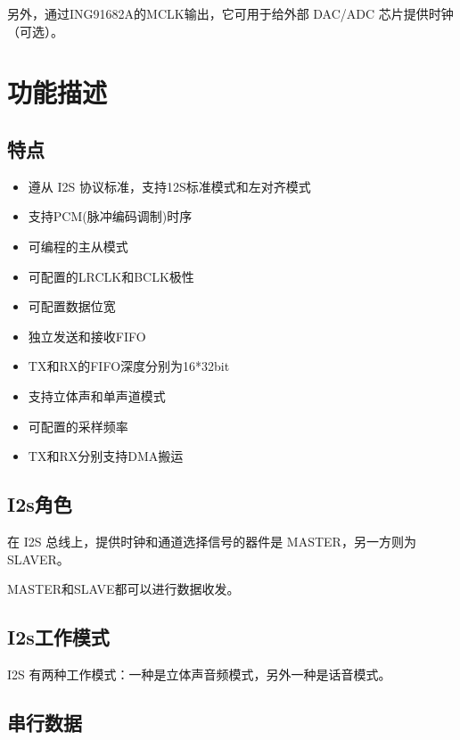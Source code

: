 \documentclass[
  12pt,
]{book}
\begin{document}
另外，通过ING91682A的MCLK输出，它可用于给外部 DAC/ADC 芯片提供时钟（可选）。

\hypertarget{ux529fux80fdux63cfux8ff0-2}{%
\section{功能描述}\label{ux529fux80fdux63cfux8ff0-2}}

\hypertarget{ux7279ux70b9-2}{%
\subsection{特点}\label{ux7279ux70b9-2}}

\begin{itemize}
\item
  遵从 I2S 协议标准，支持12S标准模式和左对齐模式
\item
  支持PCM(脉冲编码调制)时序
\item
  可编程的主从模式
\item
  可配置的LRCLK和BCLK极性
\item
  可配置数据位宽
\item
  独立发送和接收FIFO
\item
  TX和RX的FIFO深度分别为16*32bit
\item
  支持立体声和单声道模式
\item
  可配置的采样频率
\item
  TX和RX分别支持DMA搬运
\end{itemize}

\hypertarget{i2sux89d2ux8272}{%
\subsection{I2s角色}\label{i2sux89d2ux8272}}

在 I2S 总线上，提供时钟和通道选择信号的器件是 MASTER，另一方则为 SLAVER。

MASTER和SLAVE都可以进行数据收发。

\hypertarget{i2sux5de5ux4f5cux6a21ux5f0f}{%
\subsection{I2s工作模式}\label{i2sux5de5ux4f5cux6a21ux5f0f}}

I2S 有两种工作模式：一种是立体声音频模式，另外一种是话音模式。

\hypertarget{ux4e32ux884cux6570ux636e}{%
\subsection{串行数据}\label{ux4e32ux884cux6570ux636e}}
\end{document}
